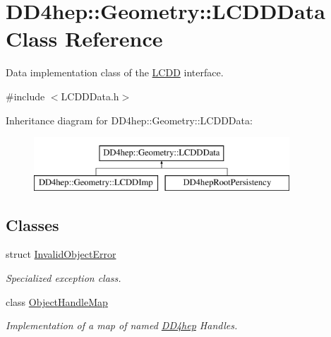 \hypertarget{class_d_d4hep_1_1_geometry_1_1_l_c_d_d_data}{}\section{D\+D4hep\+:\+:Geometry\+:\+:L\+C\+D\+D\+Data Class Reference}
\label{class_d_d4hep_1_1_geometry_1_1_l_c_d_d_data}


Data implementation class of the \hyperlink{class_d_d4hep_1_1_geometry_1_1_l_c_d_d}{L\+C\+DD} interface.  




{\ttfamily \#include $<$L\+C\+D\+D\+Data.\+h$>$}

Inheritance diagram for D\+D4hep\+:\+:Geometry\+:\+:L\+C\+D\+D\+Data\+:\begin{figure}[H]
\begin{center}
\leavevmode
\includegraphics[height=2.000000cm]{class_d_d4hep_1_1_geometry_1_1_l_c_d_d_data}
\end{center}
\end{figure}
\subsection*{Classes}
\begin{DoxyCompactItemize}
\item 
struct \hyperlink{struct_d_d4hep_1_1_geometry_1_1_l_c_d_d_data_1_1_invalid_object_error}{Invalid\+Object\+Error}
\begin{DoxyCompactList}\small\item\em Specialized exception class. \end{DoxyCompactList}\item 
class \hyperlink{class_d_d4hep_1_1_geometry_1_1_l_c_d_d_data_1_1_object_handle_map}{Object\+Handle\+Map}
\begin{DoxyCompactList}\small\item\em Implementation of a map of named \hyperlink{namespace_d_d4hep}{D\+D4hep} Handles. \end{DoxyCompactList}\end{DoxyCompactItemize}

